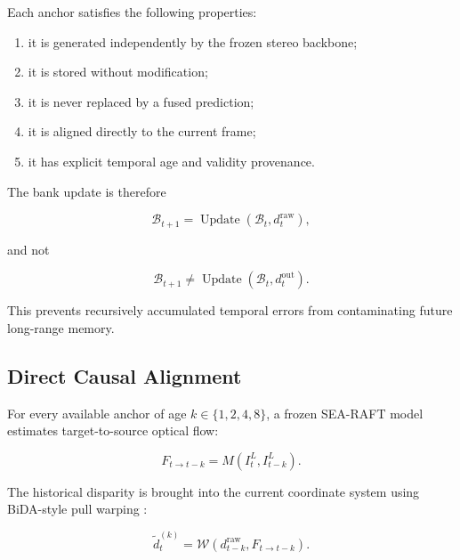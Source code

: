 \documentclass[11pt,a4paper]{article}
\begin{document}
Each anchor satisfies the following properties:

\begin{enumerate}
    \item it is generated independently by the frozen stereo backbone;
    \item it is stored without modification;
    \item it is never replaced by a fused prediction;
    \item it is aligned directly to the current frame;
    \item it has explicit temporal age and validity provenance.
\end{enumerate}

The bank update is therefore

\begin{equation}
\mathcal{B}_{t+1}
=
\operatorname{Update}
\left(
\mathcal{B}_t,
d_t^{\mathrm{raw}}
\right),
\label{eq:bank_update}
\end{equation}

and not

\begin{equation}
\mathcal{B}_{t+1}
\neq
\operatorname{Update}
\left(
\mathcal{B}_t,
d_t^{\mathrm{out}}
\right).
\end{equation}

This prevents recursively accumulated temporal errors from contaminating
future long-range memory.

\subsection{Direct Causal Alignment}
\label{sec:direct_alignment}

For every available anchor of age \(k\in\{1,2,4,8\}\), a frozen
SEA-RAFT model \cite{wang2024searaft} estimates target-to-source optical
flow:

\begin{equation}
F_{t\rightarrow t-k}
=
M\left(I_t^L,I_{t-k}^L\right).
\end{equation}

The historical disparity is brought into the current coordinate system
using BiDA-style pull warping \cite{bidastereo2024}:

\begin{equation}
\widetilde d_t^{(k)}
=
\mathcal{W}
\left(
d_{t-k}^{\mathrm{raw}},
F_{t\rightarrow t-k}
\right).
\label{eq:anchor_warp}
\end{equation}
\end{document}
